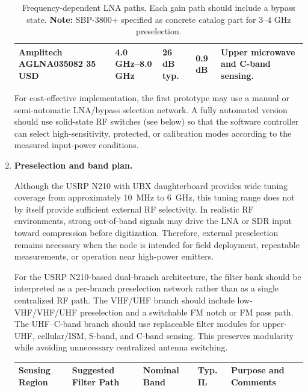 \documentclass[11pt,a4paper]{article}
\newcommand{\blue}[1]{\textcolor{priceblue}{\textbf{#1}}}
\newcommand{\gc}{\textbullet}
\begin{document}
\begin{enumerate}[label=\roman*)]
\begin{table}[!ht]
\begin{tabular}{p{4.1cm}p{2.4cm}p{1.7cm}p{1.5cm}p{4.7cm}}
				Amplitech AGLNA035082
				\blue{35 USD}
				\href{https://shop.amplitechinc.com/collections/lna-s}{\gc} &
				4.0 GHz--8.0 GHz &
				26 dB typ. &
				0.9 dB &
				Upper microwave and C-band sensing. \\
				
				\bottomrule
			\end{tabular}
			\caption{Frequency-dependent LNA paths. Each gain path should include a bypass state.
				\textbf{Note:} SBP-3800+ specified as concrete catalog part for 3--4 GHz preselection.}
			\label{tab:lna-selection}
		\end{table}
		
		For cost-effective implementation, the first prototype may use a manual or
		semi-automatic LNA/bypass selection network. A fully automated version should
		use solid-state RF switches (see below) so that the software controller can
		select high-sensitivity, protected, or calibration modes according to the
		measured input-power conditions.
		
		\item \textbf{Preselection and band plan.}
		
		Although the USRP N210 with UBX daughterboard provides wide tuning coverage from
		approximately 10~MHz to 6~GHz, this tuning range does not by itself provide
		sufficient external RF selectivity. In realistic RF environments, strong
		out-of-band signals may drive the LNA or SDR input toward compression before
		digitization. Therefore, external preselection remains necessary when the node
		is intended for field deployment, repeatable measurements, or operation near
		high-power emitters.
		
		For the USRP N210-based dual-branch architecture, the filter bank should be
		interpreted as a per-branch preselection network rather than as a single
		centralized RF path. The VHF/UHF branch should include low-VHF/VHF/UHF
		preselection and a switchable FM notch or FM pass path. The UHF--C-band branch
		should use replaceable filter modules for upper-UHF, cellular/ISM, S-band, and
		C-band sensing. This preserves modularity while avoiding unnecessary centralized
		antenna switching.
		
		\begin{table}[htbp]
			\centering
			\small
			\begin{tabular}{p{2.4cm}p{3.1cm}p{2.5cm}p{1.6cm}p{4.9cm}}
				\toprule
				\textbf{Sensing Region} &
				\textbf{Suggested Filter Path} &
				\textbf{Nominal Band} &
				\textbf{Typ. IL} &
				\textbf{Purpose and Comments} \\
				\midrule
				

\end{tabular}
\end{table}
\end{enumerate}
\end{document}

